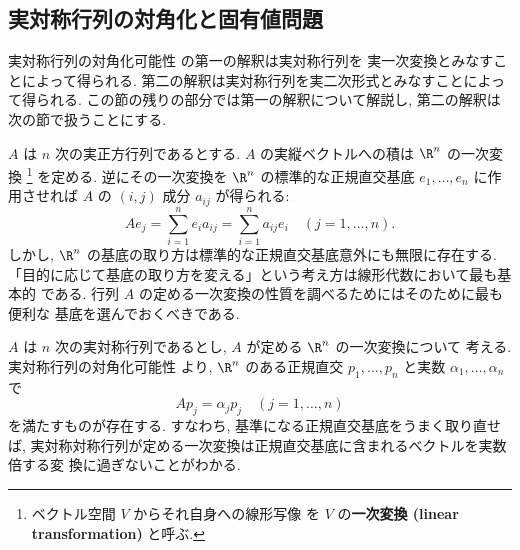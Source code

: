 \documentclass[12pt,twoside]{jarticle}
\begin{document}

\subsection{実対称行列の対角化と固有値問題}
\label{sec:real-sym-eigen-val-problem}

実対称行列の対角化可能性  の第一の解釈は実対称行列を
実一次変換とみなすことによって得られる.
第二の解釈は実対称行列を実二次形式とみなすことによって得られる.
この節の残りの部分では第一の解釈について解説し, 
第二の解釈は次の節で扱うことにする.

$A$ は $n$ 次の実正方行列であるとする.  
$A$ の実縦ベクトルへの積は $\R^n$ の一次変換%
\footnote{ベクトル空間 $V$ からそれ自身への線形写像
  を $V$ の{\bf 一次変換 (linear transformation)} と呼ぶ.}%
を定める.  逆にその一次変換を $\R^n$ の標準的な正規直交基底 $e_1,\dots,e_n$ 
に作用させれば $A$ の $(i,j)$ 成分 $a_{ij}$ が得られる:
\begin{equation*}
  Ae_j = \sum_{i=1}^n e_i a_{ij} = \sum_{i=1}^n a_{ij} e_i
  \quad (j=1,\dots,n).
\end{equation*}
しかし, $\R^n$ の基底の取り方は標準的な正規直交基底意外にも無限に存在する.
「目的に応じて基底の取り方を変える」という考え方は線形代数において最も基本的
である.  行列 $A$ の定める一次変換の性質を調べるためにはそのために最も便利な
基底を選んでおくべきである.

$A$ は $n$ 次の実対称行列であるとし, $A$ が定める $\R^n$ の一次変換について
考える.  実対称行列の対角化可能性  より, 
$\R^n$ のある正規直交 $p_1,\dots,p_n$ と実数 $\alpha_1,\dots,\alpha_n$ で 
\begin{equation*}
  A p_j = \alpha_j p_j
  \quad (j=1,\dots,n)
\end{equation*}
を満たすものが存在する.  すなわち, 基準になる正規直交基底をうまく取り直せば,
実対称対称行列が定める一次変換は正規直交基底に含まれるベクトルを実数倍する変
換に過ぎないことがわかる.

\end{document}
